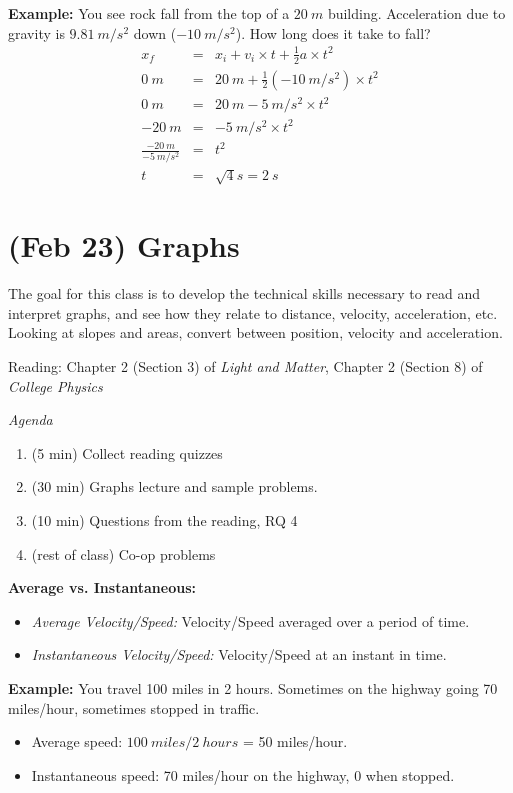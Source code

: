 \documentclass[12pt]{article}
\begin{document}
\noindent \textbf{Example:} You see rock fall from the top of a $20~m$ building. Acceleration due to gravity is $9.81~m/s^2$ down ($-10~m/s^2$). How long does it take to fall?
\begin{eqnarray}
x_f &=& x_i + v_i\times t + \frac{1}{2}a\times t^2 \\ 
0~m &=& 20~m + \frac{1}{2}(-10~m/s^2)\times t^2 \\
0~m &=& 20~m - 5~m/s^2\times t^2 \\
-20~m &=& -5~m/s^2\times t^2 \\
\frac{-20~m}{-5~m/s^2} &=& t^2 \\
t &=& \sqrt{4}s = 2~s
\end{eqnarray}

\clearpage

	\section{(Feb 23) \textbf{Graphs}}
	
	The goal for this class is to develop the technical skills necessary to read and interpret graphs, and see how they relate to distance, velocity, acceleration, etc. Looking at slopes and areas, convert between position, velocity and acceleration.
	
	Reading: Chapter 2 (Section 3) of \textit{Light and Matter}, Chapter 2 (Section 8) of \textit{College Physics}
	
	\textit{Agenda}	
	
	\begin{enumerate}
		\item (5 min) Collect reading quizzes
		\item (30 min) Graphs lecture and sample problems.
		\item (10 min) Questions from the reading, RQ 4
		\item (rest of class) Co-op problems
	\end{enumerate}
	
\noindent \textbf{\large Average vs. Instantaneous:}
\begin{itemize}
	\item \textit{Average Velocity/Speed:}  Velocity/Speed averaged over a period of time.
	\item \textit{Instantaneous Velocity/Speed:} Velocity/Speed at an instant in time.
\end{itemize}

\textbf{Example:} You travel 100 miles in 2 hours. Sometimes on the highway going 70 miles/hour, sometimes stopped in traffic.
\begin{itemize}
	\item Average speed: $100~miles/2~hours$ = 50 miles/hour.
	\item Instantaneous speed: 70 miles/hour on the highway, 0 when stopped.
\end{itemize}
	
\end{document}
